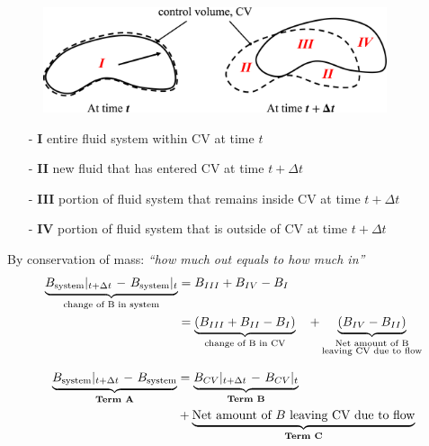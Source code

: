 \documentclass[12pt, a4paper]{article}
\numberwithin{equation}{subsection}
\begin{document}
\begin{tcolorbox}[breakable, title = \textbf{Derivation of RTT}]
\begin{figure}[H]
    \centering
    \includegraphics[width = 0.9\textwidth]{img/control_volume.eps}
\end{figure}

\begin{itemize}
    \item[-] \textbf{I}  entire fluid system within CV at time $t$
    \item[-] \textbf{II} new fluid that has entered CV at time $t + \Delta t$
    \item[-] \textbf{III} portion of fluid system that remains inside CV at time $t + \Delta t$
    \item[-] \textbf{IV} portion of fluid system that is outside of CV at time $t + \Delta t$
\end{itemize}

By conservation of mass: \textit{``how much out equals to how much in''}
\begin{align*}
\begin{split}
    \underbrace{B_{\rm system} \lvert_{t + \Delta t}  \ -\  B_{\rm system} \lvert_{t}}_{\text{change of B in system}} & = B_{III}+B_{IV}-B_{I}\\
    & = \underbrace{(B_{III}+B_{II}-B_{I})}_{\text{change of B in CV}}\quad +\underbrace{(B_{IV}-B_{II})}_{\substack{\text{Net amount of B} \\ \text{leaving CV due to flow}}}\\
\end{split}
\end{align*}

\begin{align*}
\begin{split}
    \underbrace{B_{\rm system} \lvert_{t + \Delta t} \ -\ B_{\rm system}}_{\textbf{Term A}} 
    &= \underbrace{B_{CV} \lvert_{t + \Delta t} \ -\  B_{CV}  \lvert_{t}}_{\textbf{Term B}}\\
    & + \underbrace{\text{Net amount of $B$ leaving CV due to flow}}_{\textbf{Term C}}
\end{split}
\end{align*}


\end{tcolorbox}
\end{document}

